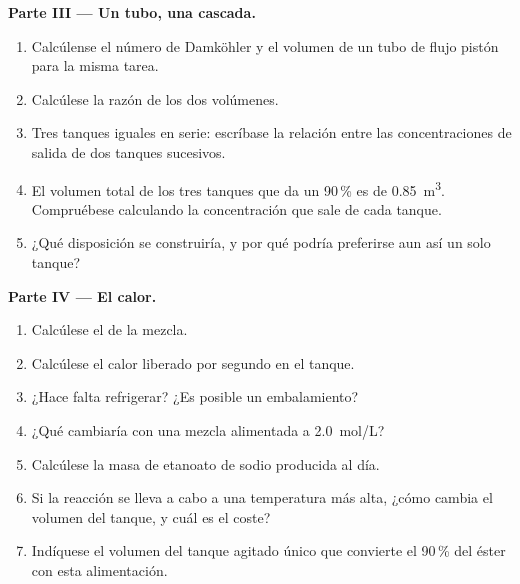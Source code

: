 \begin{problem}
\medskip
\noindent\textbf{Parte III --- Un tubo, una cascada.}
\begin{enumerate}[resume]
  \item Calcúlense el número de Damköhler y el volumen de un tubo de flujo pistón para
        la misma tarea.
  \item Calcúlese la razón de los dos volúmenes.
  \item Tres tanques iguales en serie: escríbase la relación entre las concentraciones
        de salida de dos tanques sucesivos.
  \item El volumen total de los tres tanques que da un 90\,\% es de
        \qty{0.85}{m^3}. Compruébese calculando la concentración que sale de cada
        tanque.
  \item ¿Qué disposición se construiría, y por qué podría preferirse aun así un solo
        tanque?
\end{enumerate}

\medskip
\noindent\textbf{Parte IV --- El calor.}
\begin{enumerate}[resume]
  \item Calcúlese el  de la mezcla.
  \item Calcúlese el calor liberado por segundo en el tanque.
  \item ¿Hace falta refrigerar? ¿Es posible un embalamiento?
  \item ¿Qué cambiaría con una mezcla alimentada a \qty{2.0}{mol/L}?
  \item Calcúlese la masa de etanoato de sodio producida al día.
  \item Si la reacción se lleva a cabo a una temperatura más alta, ¿cómo cambia el volumen
        del tanque, y cuál es el coste?
  \item Indíquese el volumen del tanque agitado único que convierte el 90\,\% del
        éster con esta alimentación.
\end{enumerate}
\end{problem}

